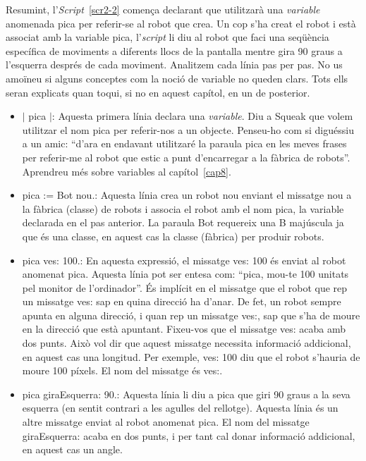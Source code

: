 Resumint, l'\emph{Script}~\ref{scr2-2} comença declarant que utilitzarà una \emph{variable} anomenada \textsf{pica} per referir-se al robot que crea. Un cop s'ha creat el robot i està associat amb la variable \textsf{pica}, l'\emph{script} li diu al robot que faci una seqüència específica de moviments a diferents llocs de la pantalla mentre gira 90 graus a l'esquerra després de cada moviment. Analitzem cada línia pas per pas. No us amoïneu si alguns conceptes com la noció de variable no queden clars. Tots ells seran explicats quan toqui, si no en aquest capítol, en un de posterior.

\begin{itemize}
\item[] \textsf{$\mid$ pica $\mid$}: Aquesta primera línia declara una \emph{variable}. Diu a Squeak que volem utilitzar el nom \textsf{pica} per referir-nos a un objecte. Penseu-ho com si diguéssiu a un amic: ``d'ara en endavant utilitzaré la paraula \textsf{pica} en les meves frases per referir-me al robot que estic a punt d'encarregar a la fàbrica de robots''. Aprendreu més sobre variables al capítol~\ref{cap8}.
\item[] \textsf{pica := Bot nou.}: Aquesta línia crea un robot nou enviant el missatge \textsf{nou} a la fàbrica (classe) de robots i associa el robot amb el nom \textsf{pica}, la variable declarada en el pas anterior. La paraula \textsf{Bot} requereix una B majúscula ja que és una classe, en aquest cas la classe (fàbrica) per produir robots.
\item[] \textsf{pica ves: 100.}: En aquesta expressió, el missatge \textsf{ves: 100} és enviat al robot anomenat \textsf{pica}. Aquesta línia pot ser entesa com: ``\textsf{pica}, mou-te 100 unitats pel monitor de l'ordinador''. És implícit en el missatge que el robot que rep un missatge \textsf{ves:} sap en quina direcció ha d'anar. De fet, un robot sempre apunta en alguna direcció, i quan rep un missatge \textsf{ves:}, sap que s'ha de moure en la direcció que està apuntant. Fixeu-vos que el missatge \textsf{ves:} acaba amb dos punts. Això vol dir que aquest missatge necessita informació addicional, en aquest cas una longitud. Per exemple, \textsf{ves: 100} diu que el robot s'hauria de moure 100 píxels. El nom del missatge és \textsf{ves:}.        
\item[]\textsf{pica giraEsquerra: 90.}: Aquesta línia li diu a \textsf{pica} que giri 90 graus a la seva esquerra (en sentit contrari a les agulles del rellotge). Aquesta línia és un altre missatge enviat al robot anomenat \textsf{pica}. El nom del missatge \textsf{giraEsquerra:} acaba en dos punts, i per tant cal donar informació addicional, en aquest cas un angle.   
\end{itemize}

